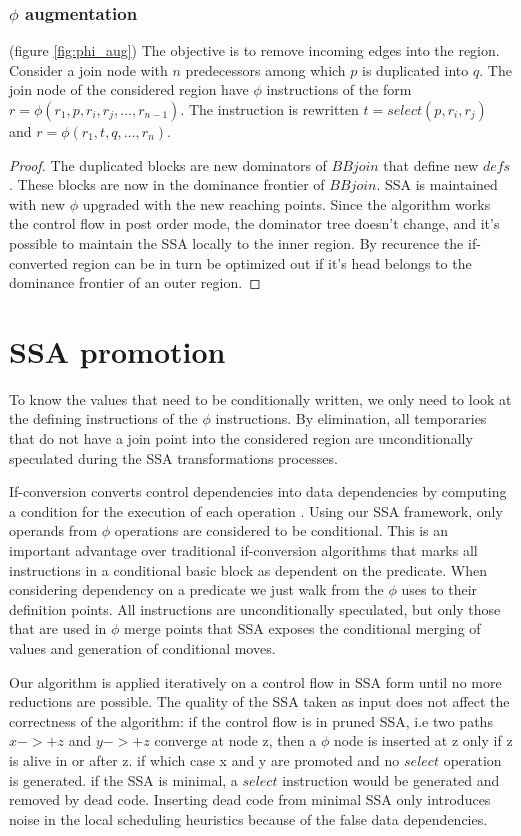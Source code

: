 \subsubsection{$\phi$ augmentation} (figure \ref{fig:phi_aug})
The objective is to remove incoming edges into the region. 
Consider a join node with $n$ predecessors among which $p$ is duplicated into $q$.  The join node of the considered region have $\phi$ instructions of the form $r=\phi(r_1,p,r_i,r_j,\dots,r_{n-1})$. The instruction is rewritten $t=select(p,r_i,r_j)$ and \mbox{$r=\phi(r_1,t,q,\dots,r_n)$}. \\
\begin{proof}The duplicated blocks are new dominators of $BBjoin$ that define new $defs$. These blocks are now in the dominance frontier of $BBjoin$. SSA is maintained with new $\phi$ upgraded with the new reaching points.
Since the algorithm works the control flow in post order mode, the dominator tree doesn't change, and it's possible to maintain the SSA locally to the inner region. By recurence the if-converted region can be in turn be optimized out if it's head belongs to the dominance frontier of an outer region.
\end{proof}

\section{SSA promotion}

To know the values that need to be conditionally written, we only need to look at the defining instructions of the $\phi$ instructions. By elimination, all temporaries that do not have a join point into the considered region are unconditionally speculated during the SSA transformations processes.

If-conversion converts control dependencies into data dependencies by computing a condition for the execution of each operation \cite{Schlansker-predicated}. Using our SSA framework, only operands from $\phi$ operations are considered to be conditional. This is an important advantage over traditional if-conversion algorithms that marks all instructions in a conditional basic block as dependent on the predicate. When considering dependency on a predicate we just walk from the $\phi$ uses to their definition points. All instructions are unconditionally speculated, but only those that are used in $\phi$ merge points that SSA exposes the conditional merging of values and generation of conditional moves.

Our algorithm is applied iteratively on a control flow in SSA form until no more reductions are possible. The quality of the SSA taken as input does not affect the correctness of the algorithm: if the control flow is in pruned SSA, i.e two paths $x->+z$ and $y->+z$ converge at node z, then a $\phi$ node is inserted at z only if z is alive in or after z. if which case x and y are promoted and no $select$ operation is generated. if the SSA is minimal, a $select$ instruction would be generated and removed by dead code. Inserting dead code from minimal SSA only introduces noise in the local scheduling heuristics because of the false data dependencies.

